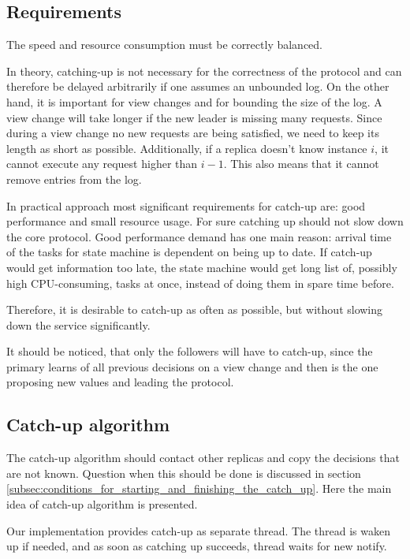 \subsection{Requirements}
\label{subsec:catch_up_requirements}
The speed and resource consumption must be correctly balanced.

In theory, catching-up is not necessary for the correctness of the protocol and can therefore be delayed arbitrarily if one assumes an unbounded log. On the other hand, it is important for view changes and for bounding the size of the log. A view change will take longer if the new leader is missing many requests. Since during a view change no new requests are being satisfied, we need to keep its length as short as possible. Additionally, if a replica doesn't know instance $i$, it cannot execute any request higher than $i-1$. This also means that it cannot remove entries from the log.

In practical approach most significant requirements for catch-up are: good performance and small resource usage. For sure catching up should not slow down the core protocol.
Good performance demand has one main reason: arrival time of the tasks for state machine is dependent on being up to date. If catch-up would get information too late, the state machine would get long list of, possibly high CPU-consuming, tasks at once, instead of doing them in spare time before.

Therefore, it is desirable to catch-up as often as possible, but without slowing down the service significantly.

It should be noticed, that only the followers will have to catch-up, since the primary learns of all previous decisions on a view change and then is the one proposing new values and leading the protocol.

\subsection{Catch-up algorithm}
\label{subsec:catch_up_algorithm}
The catch-up algorithm should contact other replicas and copy the decisions that are not known. Question when this should be done is discussed in section \ref{subsec:conditions_for_starting_and_finishing_the_catch_up}. Here the main idea of \paxosJava catch-up algorithm is presented.

Our implementation provides catch-up as separate thread. The thread is waken up if needed, and as soon as catching up succeeds, thread waits for new notify.

